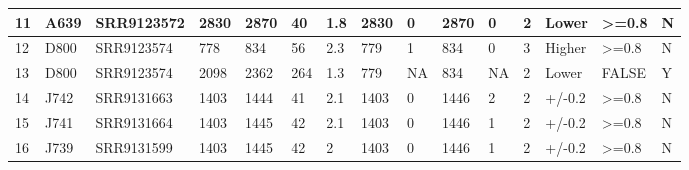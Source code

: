 \documentclass{article}
\begin{document}
{\begin{landscape}
\begin{table}[]
{\begin{tabular}{lllllllllllllll}
\multicolumn{1}{|l|}{11} & \multicolumn{1}{l|}{A639} & \multicolumn{1}{l|}{SRR9123572} & \multicolumn{1}{l|}{2830} & \multicolumn{1}{l|}{2870} & \multicolumn{1}{l|}{40} & \multicolumn{1}{l|}{1.8} & \multicolumn{1}{l|}{2830} & \multicolumn{1}{l|}{0} & \multicolumn{1}{l|}{2870} & \multicolumn{1}{l|}{0} & \multicolumn{1}{l|}{2} & \multicolumn{1}{l|}{Lower} & \multicolumn{1}{l|}{\textgreater{}=0.8} & \multicolumn{1}{l|}{N} \\ \hline
\multicolumn{1}{|l|}{12} & \multicolumn{1}{l|}{D800} & \multicolumn{1}{l|}{SRR9123574} & \multicolumn{1}{l|}{778} & \multicolumn{1}{l|}{834} & \multicolumn{1}{l|}{56} & \multicolumn{1}{l|}{2.3} & \multicolumn{1}{l|}{779} & \multicolumn{1}{l|}{1} & \multicolumn{1}{l|}{834} & \multicolumn{1}{l|}{0} & \multicolumn{1}{l|}{3} & \multicolumn{1}{l|}{Higher} & \multicolumn{1}{l|}{\textgreater{}=0.8} & \multicolumn{1}{l|}{N} \\ \hline
\multicolumn{1}{|l|}{13} & \multicolumn{1}{l|}{D800} & \multicolumn{1}{l|}{SRR9123574} & \multicolumn{1}{l|}{2098} & \multicolumn{1}{l|}{2362} & \multicolumn{1}{l|}{264} & \multicolumn{1}{l|}{1.3} & \multicolumn{1}{l|}{779} & \multicolumn{1}{l|}{NA} & \multicolumn{1}{l|}{834} & \multicolumn{1}{l|}{NA} & \multicolumn{1}{l|}{2} & \multicolumn{1}{l|}{Lower} & \multicolumn{1}{l|}{FALSE} & \multicolumn{1}{l|}{Y} \\ \hline
\multicolumn{1}{|l|}{14} & \multicolumn{1}{l|}{J742} & \multicolumn{1}{l|}{SRR9131663} & \multicolumn{1}{l|}{1403} & \multicolumn{1}{l|}{1444} & \multicolumn{1}{l|}{41} & \multicolumn{1}{l|}{2.1} & \multicolumn{1}{l|}{1403} & \multicolumn{1}{l|}{0} & \multicolumn{1}{l|}{1446} & \multicolumn{1}{l|}{2} & \multicolumn{1}{l|}{2} & \multicolumn{1}{l|}{+/-0.2} & \multicolumn{1}{l|}{\textgreater{}=0.8} & \multicolumn{1}{l|}{N} \\ \hline
\multicolumn{1}{|l|}{15} & \multicolumn{1}{l|}{J741} & \multicolumn{1}{l|}{SRR9131664} & \multicolumn{1}{l|}{1403} & \multicolumn{1}{l|}{1445} & \multicolumn{1}{l|}{42} & \multicolumn{1}{l|}{2.1} & \multicolumn{1}{l|}{1403} & \multicolumn{1}{l|}{0} & \multicolumn{1}{l|}{1446} & \multicolumn{1}{l|}{1} & \multicolumn{1}{l|}{2} & \multicolumn{1}{l|}{+/-0.2} & \multicolumn{1}{l|}{\textgreater{}=0.8} & \multicolumn{1}{l|}{N} \\ \hline
\multicolumn{1}{|l|}{16} & \multicolumn{1}{l|}{J739} & \multicolumn{1}{l|}{SRR9131599} & \multicolumn{1}{l|}{1403} & \multicolumn{1}{l|}{1445} & \multicolumn{1}{l|}{42} & \multicolumn{1}{l|}{2} & \multicolumn{1}{l|}{1403} & \multicolumn{1}{l|}{0} & \multicolumn{1}{l|}{1446} & \multicolumn{1}{l|}{1} & \multicolumn{1}{l|}{2} & \multicolumn{1}{l|}{+/-0.2} & \multicolumn{1}{l|}{\textgreater{}=0.8} & \multicolumn{1}{l|}{N} \\ \hline

\end{tabular}}
\end{table}
\end{landscape}}
\end{document}
